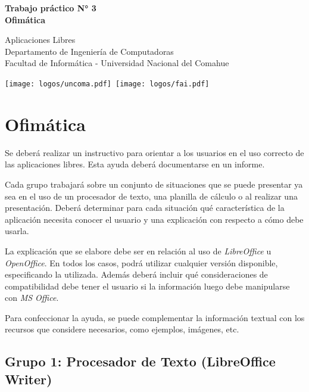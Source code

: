 \documentclass[12pt]{article}
\def\maketitle{

 \makeatletter
 {\color{bl} \centering \huge \sc \textbf{
Trabajo práctico N° 3\\
\large \vspace*{-8pt} \color{black} Ofimática
 \vspace*{8pt} }\par}
 \makeatother


 \makeatletter
 {\centering \small 
	Aplicaciones Libres\\
 	Departamento de Ingeniería de Computadoras \\
 	Facultad de Informática - Universidad Nacional del Comahue \\
 	\vspace{20pt} }
 \makeatother

\vspace{-2.5cm}
\mbox{\hspace{-1cm}\texttt{[image: logos/uncoma.pdf]}\hspace{12cm}
    \texttt{[image: logos/fai.pdf]}}

}
\begin{document}
\thispagestyle{empty}
\maketitle
\setlength{\parindent}{0pt}

\section*{Ofimática}

Se deberá realizar un instructivo para orientar a los usuarios en el uso
correcto de las aplicaciones libres. Esta ayuda deberá documentarse en un
informe.

Cada grupo trabajará sobre un conjunto de situaciones que se puede presentar
ya sea en el uso de un procesador de texto, una planilla de cálculo o al
realizar una presentación. Deberá determinar para cada situación qué
característica de la aplicación necesita conocer el usuario y una explicación
con respecto a cómo debe usarla.

La explicación que se elabore debe ser en relación al uso de
\emph{LibreOffice} u \emph{OpenOffice}. En todos los casos, podrá utilizar
cualquier versión disponible, especificando la utilizada. Además deberá
incluir qué consideraciones de compatibilidad debe tener el usuario si la
información luego debe manipularse con \emph{MS Office}.

Para confeccionar la ayuda, se puede complementar la información textual con
los recursos que considere necesarios, como ejemplos, imágenes, etc.

\subsection*{Grupo 1: Procesador de Texto (LibreOffice Writer)}
\end{document}
